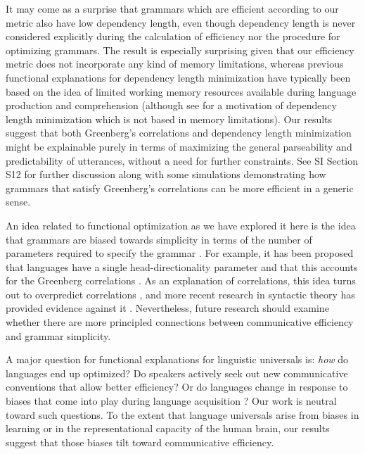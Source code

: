 \documentclass[9pt,twocolumn,twoside,lineno]{pnas-new}
\begin{document}
It may come as a surprise that grammars which are efficient according to our metric also have low dependency length, even though dependency length is never considered explicitly during the calculation of efficiency nor the procedure for optimizing grammars. The result is especially surprising given that our efficiency metric does not incorporate any kind of memory limitations, whereas previous functional explanations for dependency length minimization have typically been based on the idea of limited working memory resources available during language production and comprehension \citep{gibson1998linguistic,futrell2017noisycontext} (although see \citep{hawkins1994performance} for a motivation of dependency length minimization which is not based in memory limitations). Our results suggest that both Greenberg's correlations and dependency length minimization might be explainable purely in terms of maximizing the general parseability and predictability of utterances, without a need for further constraints. See SI Section S12 for further discussion along with some simulations demonstrating how grammars that satisfy Greenberg's correlations can be more efficient in a generic sense.


An idea related to functional optimization as we have explored it here is the idea that grammars are biased towards simplicity in terms of the number of parameters required to specify the grammar \cite{culbertson2016simplicity}. 
For example, it has been proposed that languages have a single head-directionality parameter and that this accounts for the Greenberg correlations \cite{chomsky1993theory,baker2001atoms}.
As an explanation of correlations, this idea turns out to overpredict correlations \cite{dryer1992greenbergian,baker2008macroparameter}, and more recent research in syntactic theory has provided evidence against it \cite{kayne1994antisymmetry,kandybowicz2003directionality,kayne2011there}.
Nevertheless, future research should examine whether there are more principled connections between communicative efficiency and grammar simplicity.

A major question for functional explanations for linguistic universals is: \emph{how} do languages end up optimized? Do speakers actively seek out new communicative conventions that allow better efficiency? Or do languages change in response to biases that come into play during language acquisition \cite{fedzechkina2012language,culbertson2012learning}? Our work is neutral toward such questions. To the extent that language universals arise from biases in learning or in the representational capacity of the human brain, our results suggest that those biases tilt toward communicative efficiency. 
\end{document}
